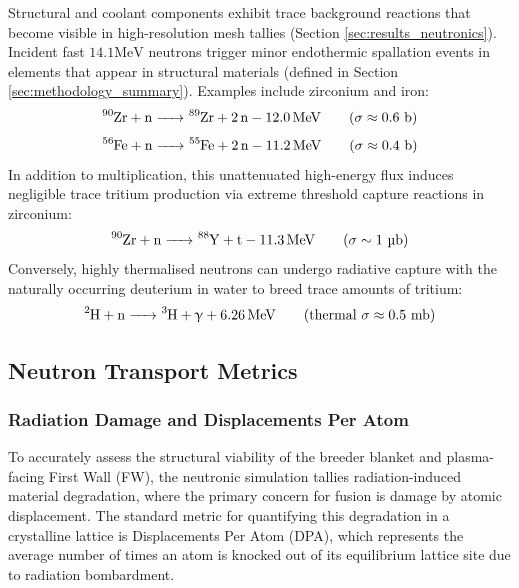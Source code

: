 \documentclass[11pt]{article}
\begin{document}
Structural and coolant components exhibit trace background reactions that become visible in
high-resolution mesh tallies (Section \ref{sec:results_neutronics}). Incident fast $14.1 \text{
MeV}$ neutrons trigger minor endothermic spallation events in elements that appear in structural
materials (defined in Section \ref{sec:methodology_summary}). Examples include zirconium and iron:
\begin{equation}
    \ce{^{90}Zr + n -> ^{89}Zr + 2n} - \ce{12.0 MeV} \qquad (\sigma \approx 0.6 \text{ b})
    \label{eq:Zr_spallation}
\end{equation}
\begin{equation}
    \ce{^{56}Fe + n -> ^{55}Fe + 2n} - \ce{11.2 MeV} \qquad (\sigma \approx 0.4 \text{ b})
    \label{eq:Fe_spallation}
\end{equation}
In addition to multiplication, this unattenuated high-energy flux induces negligible trace tritium
production via extreme threshold capture reactions in zirconium:
\begin{equation}
    \ce{^{90}Zr + n -> ^{88}Y + t} - \ce{11.3 MeV} \qquad (\sigma \sim 1 \text{ \textmu b})
    \label{eq:Zr_tritium}
\end{equation}
Conversely, highly thermalised neutrons can undergo radiative capture with the naturally occurring
deuterium in water to breed trace amounts of tritium:
\begin{equation}
    \ce{^2H + n -> ^3H + \gamma} + \ce{6.26 MeV} \qquad (\text{thermal } \sigma \approx 0.5 \text{ mb})
    \label{eq:H_capture}
\end{equation}

\subsection{Neutron Transport Metrics}
\label{sec:theory_neutron_metrics}

\subsubsection{Radiation Damage and Displacements Per Atom}
\label{sec:theory_DPA}
To accurately assess the structural viability of the breeder blanket and plasma-facing First Wall
(FW), the neutronic simulation tallies radiation-induced material degradation, where the primary
concern for fusion is damage by atomic displacement. The standard metric for quantifying this
degradation in a crystalline lattice is Displacements Per Atom (DPA), which represents the average
number of times an atom is knocked out of its equilibrium lattice site due to radiation bombardment.
\end{document}
